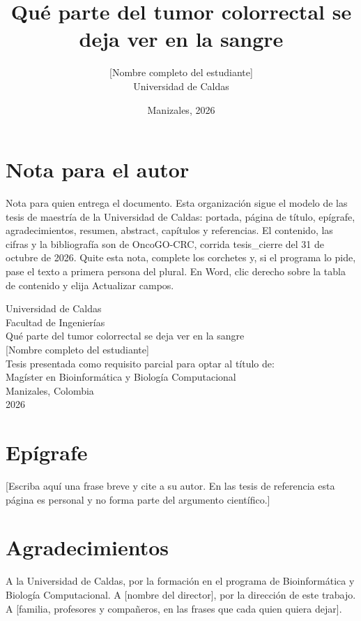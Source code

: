 \documentclass[12pt,oneside]{report}
\title{Qué parte del tumor colorrectal se deja ver en la sangre}
\author{[Nombre completo del estudiante]\\Universidad de Caldas}
\date{Manizales, 2026}
\begin{document}
\chapter*{Nota para el autor}
Nota para quien entrega el documento. Esta organización sigue el modelo de las tesis de maestría de la Universidad de Caldas: portada, página de título, epígrafe, agradecimientos, resumen, abstract, capítulos y referencias. El contenido, las cifras y la bibliografía son de OncoGO-CRC, corrida tesis\_cierre del 31 de octubre de 2026. Quite esta nota, complete los corchetes y, si el programa lo pide, pase el texto a primera persona del plural. En Word, clic derecho sobre la tabla de contenido y elija Actualizar campos.
\begin{titlepage}
\centering
\vspace*{2cm}
{\Large Universidad de Caldas}\\[0.4cm]
{\large Facultad de Ingenierías}\\[2cm]
{\LARGE Qué parte del tumor colorrectal se deja ver en la sangre}\\[2cm]
{\Large [Nombre completo del estudiante]}\\[2cm]
Tesis presentada como requisito parcial para optar al título de:\\[0.3cm]
Magíster en Bioinformática y Biología Computacional\\[2cm]
Manizales, Colombia\\2026
\end{titlepage}
\tableofcontents
\listoftables
\chapter*{Epígrafe}
[Escriba aquí una frase breve y cite a su autor. En las tesis de referencia esta página es personal y no forma parte del argumento científico.]

\chapter*{Agradecimientos}
A la Universidad de Caldas, por la formación en el programa de Bioinformática y Biología Computacional. A [nombre del director], por la dirección de este trabajo. A [familia, profesores y compañeros, en las frases que cada quien quiera dejar].
\end{document}
